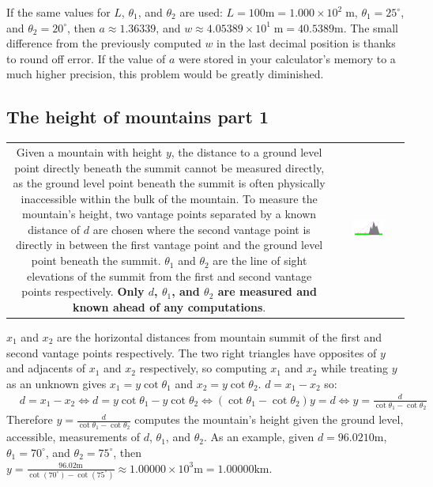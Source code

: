 \documentclass{article}
\begin{document}
If the same values for \(L\), \(\theta_1\), and \(\theta_2\) are used: \(L = 100\text{m} = 1.000 \times 10^2 \;\text{m}\), \(\theta_1 = 25^\circ\), and \(\theta_2 = 20^\circ\), then \(a \approx 1.36339\), and \(w \approx 4.05389 \times 10^1 \;\text{m} = 40.5389\text{m}\). The small difference from the previously computed \(w\) in the last decimal position is thanks to round off error. If the value of \(a\) were stored in your calculator's memory to a much higher precision, this problem would be greatly diminished. 




\subsection*{The height of mountains part 1}

\begin{tabular}{cc}
\parbox{0.5\textwidth}{
Given a mountain with height \(y\), the distance to a ground level point directly beneath the summit cannot be measured directly, as the ground level point beneath the summit is often physically inaccessible within the bulk of the mountain. To measure the mountain's height, two vantage points separated by a known distance of \(d\) are chosen where the second vantage point is directly in between the first vantage point and the ground level point beneath the summit. \(\theta_1\) and \(\theta_2\) are the line of sight elevations of the summit from the first and second vantage points respectively. {\bf Only \(d\), \(\theta_1\), and \(\theta_2\) are measured and known ahead of any computations}. 
} & \parbox{0.5\textwidth}{
\includegraphics[width = 0.5\textwidth]{mountain_height_v2}
}
\end{tabular}
\(x_1\) and \(x_2\) are the horizontal distances from mountain summit of the first and second vantage points respectively. The two right triangles have opposites of \(y\) and adjacents of \(x_1\) and \(x_2\)  respectively, so computing \(x_1\) and \(x_2\) while treating \(y\) as an unknown gives \(x_1 = y\cot\theta_1\) and \(x_2 = y\cot\theta_2\). \(d = x_1 - x_2\) so: 
\begin{align*}
& d = x_1 - x_2 
\iff d = y\cot\theta_1 - y\cot\theta_2 
\iff (\cot\theta_1 - \cot\theta_2)y = d 
\iff y = \frac{d}{\cot\theta_1 - \cot\theta_2}
\end{align*}
Therefore \(y = \frac{d}{\cot\theta_1 - \cot\theta_2}\) computes the mountain's height given the ground level, accessible, measurements of \(d\), \(\theta_1\), and \(\theta_2\). As an example, given \(d = 96.0210\text{m}\), \(\theta_1 = 70^\circ\), and \(\theta_2 = 75^\circ\), then \(y = \frac{96.02\text{m}}{\cot(70^\circ) - \cot(75^\circ)} \approx 1.00000 \times 10^3\text{m} = 1.00000\text{km}\).
\end{document}
